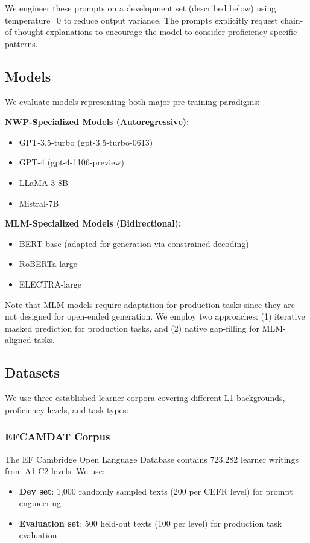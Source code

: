 We engineer these prompts on a development set (described below) using temperature=0 to reduce output variance. The prompts explicitly request chain-of-thought explanations to encourage the model to consider proficiency-specific patterns.

\subsection{Models}

We evaluate models representing both major pre-training paradigms:

\textbf{NWP-Specialized Models (Autoregressive):}
\begin{itemize}
    \item GPT-3.5-turbo (gpt-3.5-turbo-0613)
    \item GPT-4 (gpt-4-1106-preview)
    \item LLaMA-3-8B
    \item Mistral-7B
\end{itemize}

\textbf{MLM-Specialized Models (Bidirectional):}
\begin{itemize}
    \item BERT-base (adapted for generation via constrained decoding)
    \item RoBERTa-large
    \item ELECTRA-large
\end{itemize}

Note that MLM models require adaptation for production tasks since they are not designed for open-ended generation. We employ two approaches: (1) iterative masked prediction for production tasks, and (2) native gap-filling for MLM-aligned tasks.

\subsection{Datasets}

We use three established learner corpora covering different L1 backgrounds, proficiency levels, and task types:

\subsubsection{EFCAMDAT Corpus}

The EF Cambridge Open Language Database \cite{geertzen2013automatic, shatz2020refining} contains 723,282 learner writings from A1-C2 levels. We use:
\begin{itemize}
    \item \textbf{Dev set}: 1,000 randomly sampled texts (200 per CEFR level) for prompt engineering
    \item \textbf{Evaluation set}: 500 held-out texts (100 per level) for production task evaluation
\end{itemize}

